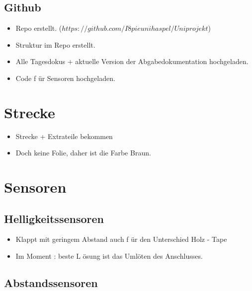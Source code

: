 \documentclass{article}
\begin{document}
\subsection{Github}

\begin{itemize}

\item Repo erstellt. ($https://github.com/I8pieunihaspel/Uniprojekt$)

\item Struktur im Repo erstellt.

\item Alle Tagesdokus + aktuelle Version der Abgabedokumentation hochgeladen.

\item Code f
\"{u}r Sensoren hochgeladen.

\end{itemize}

\section{Strecke}

\begin{itemize}

\item Strecke  + Extrateile bekommen

\item Doch keine Folie, daher ist die Farbe Braun.

\end{itemize}

\section{Sensoren}

\subsection{Helligkeitssensoren}

\begin{itemize}

\item Klappt mit geringem Abstand auch f
\"{u}r den Unterschied Holz - Tape

\item Im Moment : beste L
\"{o}sung ist das Uml\"{o}ten des Anschlusses.

\end{itemize}

\subsection{Abstandssensoren}
\end{document}
